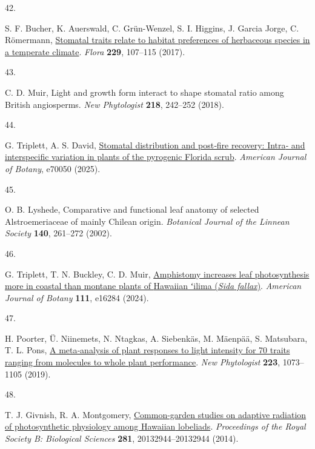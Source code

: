 \documentclass[
  letterpaper,
  DIV=11,
  numbers=noendperiod]{scrartcl}
\newlength{\cslhangindent}
\newlength{\csllabelwidth}
\newenvironment{CSLReferences}[2] %
 {\begin{list}{}{%
  \setlength{\itemindent}{0pt}
  \setlength{\leftmargin}{0pt}
  \setlength{\parsep}{0pt}
  \ifodd #1
   \setlength{\leftmargin}{\cslhangindent}
   \setlength{\itemindent}{-1\cslhangindent}
  \fi
  \setlength{\itemsep}{#2\baselineskip}}}
 {\end{list}}
\newcommand{\CSLLeftMargin}[1]{\parbox[t]{\csllabelwidth}{\strut#1\strut}}
\newcommand{\CSLRightInline}[1]{\parbox[t]{\linewidth - \csllabelwidth}{\strut#1\strut}}
\begin{document}
\begin{CSLReferences}{0}{1}
\CSLLeftMargin{42. }%
\CSLRightInline{S. F. Bucher, K. Auerswald, C. Grün-Wenzel, S. I.
Higgins, J. Garcia Jorge, C. Römermann,
\href{https://doi.org/10.1016/j.flora.2017.02.011}{Stomatal traits
relate to habitat preferences of herbaceous species in a temperate
climate}. \emph{Flora} \textbf{229}, 107--115 (2017).}

\CSLLeftMargin{43. }%
\CSLRightInline{C. D. Muir, Light and growth form interact to shape
stomatal ratio among {British} angiosperms. \emph{New Phytologist}
\textbf{218}, 242--252 (2018).}

\CSLLeftMargin{44. }%
\CSLRightInline{G. Triplett, A. S. David,
\href{https://doi.org/10.1002/ajb2.70050}{Stomatal distribution and
post‐fire recovery: {Intra}‐ and interspecific variation in plants of
the pyrogenic {Florida} scrub}. \emph{American Journal of Botany},
e70050 (2025).}

\CSLLeftMargin{45. }%
\CSLRightInline{O. B. Lyshede, Comparative and functional leaf anatomy
of selected {Alstroemeriaceae} of mainly {Chilean} origin.
\emph{Botanical Journal of the Linnean Society} \textbf{140}, 261--272
(2002).}

\CSLLeftMargin{46. }%
\CSLRightInline{G. Triplett, T. N. Buckley, C. D. Muir,
\href{https://doi.org/10.1002/ajb2.16284}{Amphistomy increases leaf
photosynthesis more in coastal than montane plants of {Hawaiian} ʻilima
(\emph{{Sida} fallax})}. \emph{American Journal of Botany} \textbf{111},
e16284 (2024).}

\CSLLeftMargin{47. }%
\CSLRightInline{H. Poorter, Ü. Niinemets, N. Ntagkas, A. Siebenkäs, M.
Mäenpää, S. Matsubara, T. L. Pons,
\href{https://doi.org/10.1111/nph.15754}{A meta‐analysis of plant
responses to light intensity for 70 traits ranging from molecules to
whole plant performance}. \emph{New Phytologist} \textbf{223},
1073--1105 (2019).}

\CSLLeftMargin{48. }%
\CSLRightInline{T. J. Givnish, R. A. Montgomery,
\href{https://doi.org/10.1098/rspb.2013.2944}{Common-garden studies on
adaptive radiation of photosynthetic physiology among {Hawaiian}
lobeliads}. \emph{Proceedings of the Royal Society B: Biological
Sciences} \textbf{281}, 20132944--20132944 (2014).}


\end{CSLReferences}
\end{document}
